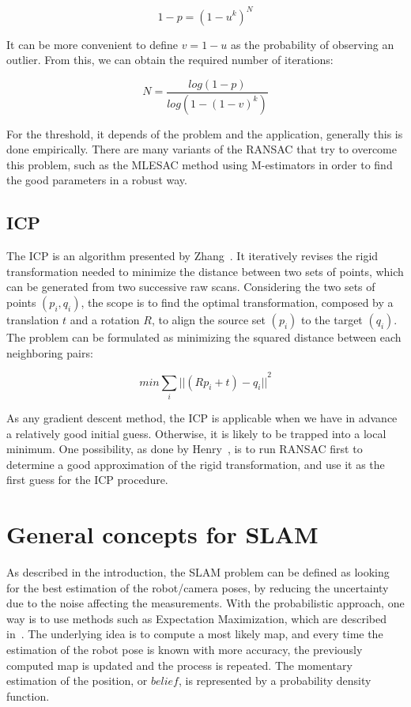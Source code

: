 \[
1-p = (1-u^k)^N
\]

It can be more convenient to define $v=1-u$ as the probability of observing an outlier. From this, we can obtain the required number of iterations:

\[
N = \frac{log(1-p)}{log(1-(1-v)^k)}
\]

For the threshold, it depends of the problem and the application, generally this is done empirically. There are many variants of the \gls{RANSAC} that try to overcome this problem, such as the MLESAC method \cite{TorrZ00} using M-estimators in order to find the good parameters in a robust way.


\subsection{ICP}

The \gls{ICP} is an algorithm presented by Zhang~\cite{zhang_92_icp}.
It iteratively revises the rigid transformation needed to minimize the distance between two sets of points, which can be generated from two successive raw scans. Considering the two sets of points $(p_{i}, q_{i})$, the scope is to find the optimal transformation, composed by a translation $t$ and a rotation $R$, to align the source set $(p_{i})$ to the target $(q_{i})$. The problem can be formulated as minimizing the squared distance between each neighboring pairs:

\[min \sum_{i}{||(Rp_{i}+t)-q_{i}||}^2\]

As any gradient descent method, the \gls{ICP} is applicable when we have in advance a relatively good initial guess. Otherwise, it is likely to be trapped into a local minimum. One possibility, as done by Henry~\cite{Henry_RGBD_2010}, is to run \gls{RANSAC} first to determine a good approximation of the rigid transformation, and use it as the first guess for the \gls{ICP} procedure.

\clearpage
\section{General concepts for SLAM}

As described in the introduction, the \gls{SLAM} problem can be defined as looking for the best estimation of the robot/camera poses, by reducing the uncertainty due to the noise affecting the measurements. With the probabilistic approach, one way is to use methods such as Expectation Maximization, which are described in~\cite{Thrun_2005}. The underlying idea is to compute a most likely map, and every time the estimation of the robot pose is known with more accuracy, the previously computed map is updated and the process is repeated. The momentary estimation of the position, or $belief$, is represented by a probability density function. 

